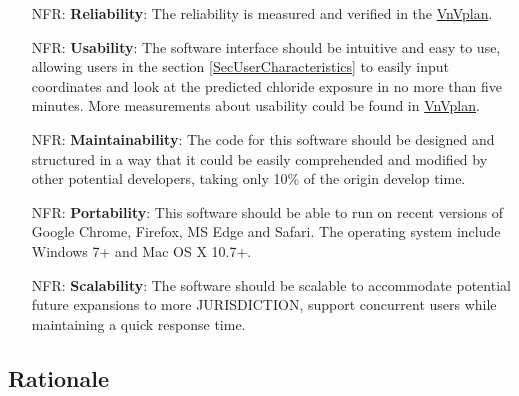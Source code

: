 \documentclass[12pt]{article}
\newcounter{nfrnum} %
\begin{document}
\noindent \begin{itemize}

\item[NFR\refstepcounter{nfrnum}\thenfrnum \label{NFR_Reliability}:]   \textbf{Reliability}: The reliability is measured and verified in the \href{https://github.com/CynthiaLiu0805/BridgeCorrosion/blob/main/docs/VnVPlan/VnVPlan.pdf}{VnVplan}.

\item[NFR\refstepcounter{nfrnum}\thenfrnum \label{NFR_Usability}:] \textbf{Usability}: The software interface should be intuitive and easy to use, allowing users in the section \ref{SecUserCharacteristics} to easily input coordinates and look at the predicted chloride exposure in no more than five minutes. More measurements about usability could be found in \href{https://github.com/CynthiaLiu0805/BridgeCorrosion/blob/main/docs/VnVPlan/VnVPlan.pdf}{VnVplan}.

\item[NFR\refstepcounter{nfrnum}\thenfrnum \label{NFR_Maintainability}:] \textbf{Maintainability}: The code for this software should be designed and structured in a way that it could be easily comprehended and modified by other potential developers, taking only 10\% of the origin develop time.

\item[NFR\refstepcounter{nfrnum}\thenfrnum \label{NFR_Portability}:]  \textbf{Portability}: This software should be able to run on recent versions of Google Chrome, Firefox, MS Edge and Safari. The operating system include Windows 7+ and Mac OS X 10.7+.

\item[NFR\refstepcounter{nfrnum}\thenfrnum \label{NFR_Scalability}:]   \textbf{Scalability}: The software should be scalable to accommodate potential future expansions to more JURISDICTION, support concurrent users while maintaining a quick response time.
\end{itemize}

\subsection{Rationale}
\end{document}
